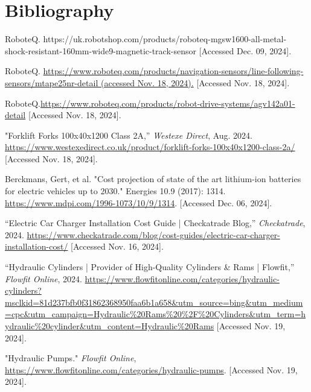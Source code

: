 \documentclass[12pt,titlepage]{article}
\begin{document}
\renewcommand{\refname}{} %

\vspace{-10pt}
\section{Bibliography}
\vspace{-37pt}
\begin{thebibliography}{99}

\footnotesize
\setlength{\baselineskip}{0.8\baselineskip}

 RoboteQ. https://uk.robotshop.com/products/roboteq-mgsw1600-all-metal-shock-resistant-160mm-wide9-magnetic-track-sensor [Accessed Dec. 09, 2024].

 RoboteQ. \url{https://www.roboteq.com/products/navigation-sensors/line-following-sensors/mtape25nr-detail (accessed Nov. 18, 2024).} [Accessed Nov. 18, 2024].

 RoboteQ.\url{https://www.roboteq.com/products/robot-drive-systems/agv142a01-detail} [Accessed Nov. 18, 2024].

 "Forklift Forks 100x40x1200 Class 2A,” \textit{Westexe Direct}, Aug. 2024. \url{https://www.westexedirect.co.uk/product/forklift-forks-100x40x1200-class-2a/} [Accessed Nov. 18, 2024].

 Berckmans, Gert, et al. "Cost projection of state of the art lithium-ion batteries for electric vehicles up to 2030." Energies 10.9 (2017): 1314. \url{https://www.mdpi.com/1996-1073/10/9/1314}. [Accessed Dec. 06, 2024].

 “Electric Car Charger Installation Cost Guide | Checkatrade Blog,” \textit{Checkatrade}, 2024. \url{https://www.checkatrade.com/blog/cost-guides/electric-car-charger-installation-cost/} [Accessed Nov. 16, 2024].

 “Hydraulic Cylinders | Provider of High-Quality Cylinders \& Rams | Flowfit,” \textit{Flowfit Online}, 2024. \url{https://www.flowfitonline.com/categories/hydraulic-cylinders?msclkid=81d237bfb0f31862368950faa6b1a658&utm_source=bing&utm_medium=cpc&utm_campaign=Hydraulic%20Rams%20%2F%20Cylinders&utm_term=hydraulic%20cylinder&utm_content=Hydraulic%20Rams} [Accessed Nov. 19, 2024].

 "Hydraulic Pumps." \textit{Flowfit Online}, \url{https://www.flowfitonline.com/categories/hydraulic-pumps}. [Accessed Nov. 19, 2024].


\end{thebibliography}
\end{document}
